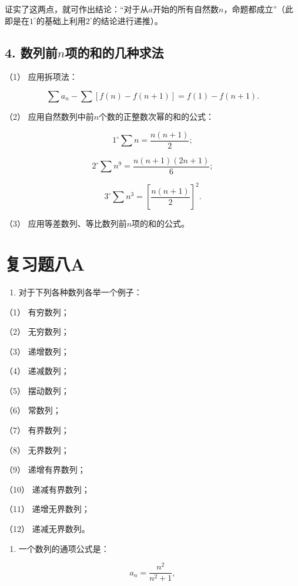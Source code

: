 证实了这两点，就可作出结论：``对于从\(a\)开始的所有自然数\(n\)，命题都成立''（此即是在\(1^{\circ}\)的基础上利用\(2^{\circ}\)的结论进行递推）。

\subsection{\texorpdfstring{4. 数列前\(n\)项的和的几种求法}{4. 数列前n项的和的几种求法}}

（1） 应用拆项法：

\[
\sum a_{n} - \sum [ f (n) - f (n + 1) ] = f (1) - f (n + 1).
\]

（2） 应用自然数列中前\(n\)个数的正整数次幂的和的公式：

\[
1^{\circ} \sum n = \frac{n (n + 1)}{2};
\]

\[
2^{\circ} \sum n^{9} = \frac{n (n + 1) (2 n + 1)}{6};
\]

\[
3^{\circ} \sum n^{3} = \left[ \frac{n (n + 1)}{2} \right]^{2}.
\]

（3） 应用等差数列、等比数列前\(n\)项的和的公式。

\section{复习题八A}

\begin{enumerate}
\item
  对于下列各种数列各举一个例子：
\end{enumerate}

（1） 有穷数列；

（2） 无穷数列；

（3） 递增数列；

（4） 递减数列；

（5） 摆动数列；

（6） 常数列；

（7） 有界数列；

（8） 无界数列；

（9） 递增有界数列；

（10） 递减有界数列；

（11） 递增无界数列；

（12） 递减无界数列。

\begin{enumerate}[start=2]
\item
  一个数列的通项公式是：
\end{enumerate}

\[
a_{n} = \frac{n^{2}}{n^{2} + 1},
\]

